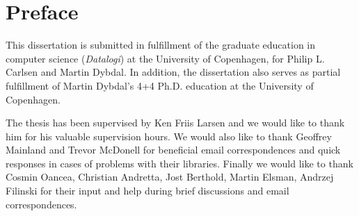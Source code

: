 {}
\chapter*{Preface}
This dissertation is submitted in fulfillment of the graduate education
in computer science (\textit{Datalogi}) at the University of
Copenhagen, for Philip L. Carlsen and Martin Dybdal. In addition, the
dissertation also serves as partial fulfillment of Martin Dybdal's 4+4
Ph.D. education at the University of Copenhagen.

The thesis has been supervised by Ken Friis Larsen and we would like
to thank him for his valuable supervision hours. We would
also like to thank Geoffrey Mainland and Trevor McDonell for beneficial
email correspondences and quick responses in cases of problems with
their libraries. Finally we would like to thank Cosmin Oancea,
Christian Andretta, Jost Berthold, Martin Elsman, Andrzej Filinski for
their input and help during brief discussions and email
correspondences.

